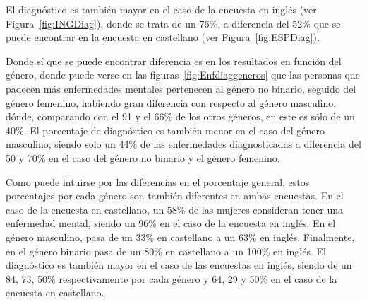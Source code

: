 \documentclass[12pt, a4paper,twoside,titlepage]{book}
\begin{document}
El diagnóstico es también mayor en el caso de la encuesta en inglés (ver Figura~\ref{fig:INGDiag}), donde se trata de un 76\%, a diferencia del 52\% que se puede encontrar en la encuesta en castellano (ver Figura~\ref{fig:ESPDiag}).

Donde sí que se puede encontrar diferencia es en los resultados en función del género, donde puede verse en las figuras~\ref{fig:Enfdiaggeneros} que las personas que padecen más enfermedades mentales pertenecen al género no binario, seguido del género femenino, habiendo gran diferencia con respecto al género masculino, dónde, comparando con el 91 y el 66\% de los otros géneros, en este es sólo de un 40\%. El porcentaje de diagnóstico es también menor en el caso del género masculino, siendo solo un 44\% de las enfermedades diagnosticadas a diferencia del 50 y 70\% en el caso del género no binario y el género femenino. 

Como puede intuirse por las diferencias en el porcentaje general, estos porcentajes por cada género son también diferentes en ambas encuestas. En el caso de la encuesta en castellano, un 58\% de las mujeres consideran tener una enfermedad mental, siendo un 96\% en el caso de la encuesta en inglés. En el género masculino, pasa de un 33\% en castellano a un 63\% en inglés. Finalmente, en el género binario pasa de un 80\% en castellano a un 100\% en inglés. 
El diagnóstico es también mayor en el caso de las encuestas en inglés, siendo de un 84, 73, 50\% respectivamente por cada género y 64, 29 y 50\% en el caso de la encuesta en castellano. 
\end{document}
